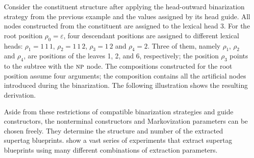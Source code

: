 \documentclass[../../document.tex]{subfiles}
\begin{document}
    \begin{wrapfigure}[7]{r}{0pt}
        
    \end{wrapfigure}
    Consider the constituent structure after applying the head-outward binarization strategy from the previous example and the values assigned by its head guide.
    All nodes constructed from the  constituent are assigned to the lexical head \(3\).
    For the root position $\rho_0 = \varepsilon$, four descendant positions are assigned to different lexical heads: $\rho_1 = 1\,1\,1$, $\rho_2=1\,1\,2$, $\rho_3 =1\,2$ and $\rho_4=2$.
    Three of them, namely $\rho_1$, $\rho_2$ and $\rho_4$, are positions of the leaves 1, 2, and 6, respectively; the position \(\rho_3\) points to the subtree with the $\textsc{np}$ node.
    The compositions constructed for the root position assume four arguments; the  composition contains all the artificial nodes introduced during the binarization.
    The following illustration shows the resulting derivation.
    \begin{center}
        
    \end{center}
    \exampleqed

    Aside from these restrictions of compatible binarization strategies and guide constructors, the nonterminal constructors and Markovization parameters can be chosen freely.
    They determine the structure and number of the extracted supertag blueprints.
     show a vast series of experiments that extract supertag blueprints using many different combinations of extraction parameters.

    \ifSubfilesClassLoaded{%
        \printindex
    }{}
\end{document}
